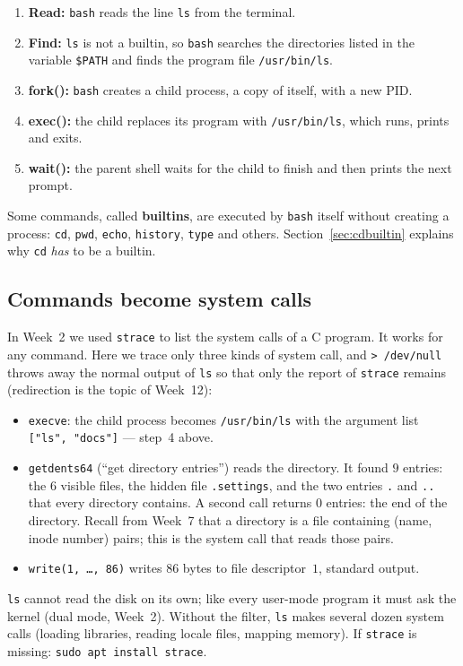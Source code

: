 \documentclass[11pt,a4paper]{article}
\newcommand{\term}[1]{\textbf{\color{mintdeep}#1}}
\newcommand{\cmd}[1]{\texttt{#1}}
\begin{document}
\begin{enumerate}[leftmargin=1.4em]
  \item \textbf{Read:} \cmd{bash} reads the line \texttt{ls} from the terminal.
  \item \textbf{Find:} \cmd{ls} is not a builtin, so \cmd{bash} searches the directories listed in the variable \texttt{\$PATH} and finds the program file \texttt{/usr/bin/ls}.
  \item \textbf{fork():} \cmd{bash} creates a child process, a copy of itself, with a new PID.
  \item \textbf{exec():} the child replaces its program with \texttt{/usr/bin/ls}, which runs, prints and exits.
  \item \textbf{wait():} the parent shell waits for the child to finish and then prints the next prompt.
\end{enumerate}

Some commands, called \term{builtins}, are executed by \cmd{bash} itself without creating a process: \cmd{cd}, \cmd{pwd}, \cmd{echo}, \cmd{history}, \cmd{type} and others. Section~\ref{sec:cdbuiltin} explains why \cmd{cd} \emph{has} to be a builtin.

\subsection{Commands become system calls}

In Week~2 we used \cmd{strace} to list the system calls of a C program. It works for any command. Here we trace only three kinds of system call, and \texttt{> /dev/null} throws away the normal output of \cmd{ls} so that only the report of \cmd{strace} remains (redirection is the topic of Week~12):


\begin{itemize}
  \item \texttt{execve}: the child process becomes \texttt{/usr/bin/ls} with the argument list \texttt{["ls", "docs"]} --- step~4 above.
  \item \texttt{getdents64} (``get directory entries'') reads the directory. It found $9$ entries: the $6$ visible files, the hidden file \texttt{.settings}, and the two entries \texttt{.} and \texttt{..} that every directory contains. A second call returns $0$ entries: the end of the directory. Recall from Week~7 that a directory is a file containing (name, inode number) pairs; this is the system call that reads those pairs.
  \item \texttt{write(1, \ldots, 86)} writes $86$ bytes to file descriptor~$1$, standard output.
\end{itemize}
\cmd{ls} cannot read the disk on its own; like every user-mode program it must ask the kernel (dual mode, Week~2). Without the filter, \cmd{ls} makes several dozen system calls (loading libraries, reading locale files, mapping memory). If \cmd{strace} is missing: \cmd{sudo apt install strace}.
\end{document}
